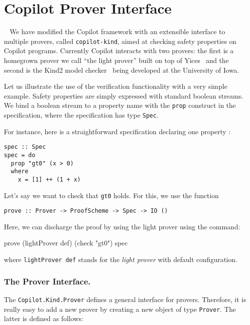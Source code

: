 \section{Copilot Prover Interface}~\label{sec:prover} 
We have modified  the Copilot framework with an extensible interface  to multiple
provers, called \texttt{copilot-kind}, aimed at checking  safety properties on Copilot
programs. Currently Copilot interacts with two provers: the first is a
homegrown prover we call ``the light prover'' built on top of
Yices~\cite{Dutertre:cav2014} and the second is the Kind2 model checker~\cite{kind2} being developed at
the University of Iowa.

Let us illustrate the use of the verification functionality with a
very simple example.  Safety properties are simply expressed with
standard boolean streams.  We bind a boolean stream to a property name
with the \texttt{prop} construct in the specification, where the
specification has type \texttt{Spec}.

For instance, here is a straightforward specification declaring one
property :

\begin{lstlisting}[frame=single]
spec :: Spec
spec = do
  prop "gt0" (x > 0)
  where
    x = [1] ++ (1 + x)
\end{lstlisting}

Let's say we want to check that \texttt{gt0} holds. For this, we use
the function

\begin{lstlisting}[frame=single]
    prove :: Prover -> ProofScheme -> Spec -> IO ()
\end{lstlisting}

Here, we can discharge the proof by  using the light prover using the command:
\begin{code}
prove (lightProver def) (check "gt0") spec
\end{code}
where \texttt{lightProver def} stands for the \emph{light prover} with
default configuration.  

\subsubsection{The Prover Interface.}\label{the-prover-interface}

The \texttt{Copilot.Kind.Prover} defines a general interface for
provers. Therefore, it is really easy to add a new prover by creating a
new object of type \texttt{Prover}. The latter is defined as follows:

